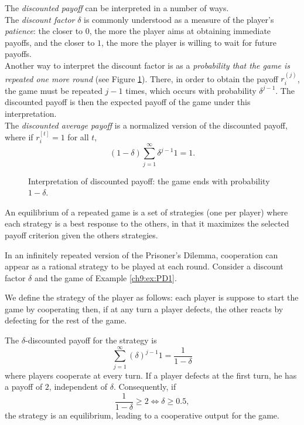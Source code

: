 The \emph{discounted payoff} can be interpreted in a number of ways.\\
The \emph{discount factor} $\delta$ is commonly understood as a measure of the player's \emph{patience}: the closer to $0$, the more the player aims at obtaining immediate payoffs, and the closer to $1$, the more the player is willing to wait for future payoffs.\\
Another way to interpret the discount factor is as a \emph{probability that the game is repeated one more round} (see Figure \ref{fig:infiRepeatedDiscount}). There, in order to obtain the payoff $r_i^{(j)}$, the game must be repeated $j-1$ times, which occurs with probability $\delta^{j-1}$. The discounted payoff is then the expected payoff of the game under this interpretation.\\
The \emph{discounted average payoff} is a normalized version of the discounted payoff, where if $r_i^{[t]} = 1$ for all $t$,
$$ (1-\delta) \sum_{j = 1}^{\infty} \delta^{j-1} 1 = 1. $$
\begin{figure}[]
\centering
{}
\caption{Interpretation of discounted payoff: the game ends with probability $1 - \delta$.}
\label{fig:infiRepeatedDiscount}
\end{figure}



\begin{definition}
An equilibrium of a repeated game is a set of strategies (one per player) where each strategy is a best response to the others, in that it maximizes the selected payoff criterion given the others strategies.
\end{definition}

\begin{example}
\label{ch9:ex:trigger}
In an infinitely repeated version of the Prisoner's Dilemma, cooperation can appear as a rational strategy to be played at each round.
Consider a discount factor $\delta$ and the game of Example \ref{ch9:ex:PD1}.

We define the strategy of the player as follows: each player is suppose to start the game by cooperating then, if at any turn a player defects, the other reacts by defecting for the rest of the game.

The $\delta$-discounted payoff for the strategy is
$$ \sum_{j = 1}^{\infty}(\delta)^{j-1} 1 = \frac{1}{1-\delta}$$
where players cooperate at every turn.
If a player defects at the first turn, he has a payoff of $2$, independent of $\delta$.
Consequently, if
$$ \frac{1}{1-\delta} \geq 2 \Leftrightarrow \delta \geq 0.5, $$
the  strategy is an equilibrium, leading to a cooperative output for the game.
\end{example}


